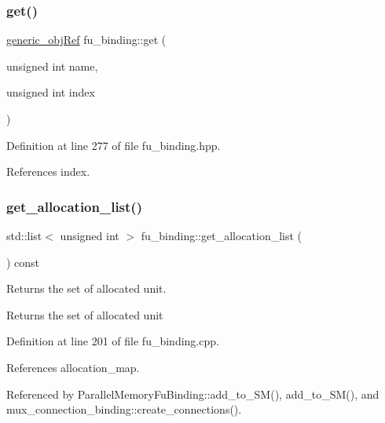 \subsubsection{\texorpdfstring{get()}{get()}\hspace{0.1cm}{\footnotesize\ttfamily [2/2]}}
{\footnotesize\ttfamily \hyperlink{generic__obj_8hpp_acb533b2ef8e0fe72e09a04d20904ca81}{generic\+\_\+obj\+Ref} fu\+\_\+binding\+::get (\begin{DoxyParamCaption}\item[{unsigned int}]{name,  }\item[{unsigned int}]{index }\end{DoxyParamCaption})\hspace{0.3cm}{\ttfamily [inline]}}



Definition at line 277 of file fu\+\_\+binding.\+hpp.



References index.

\mbox{\label{classfu__binding_a833c4b4b6c6f4d52eec19e1de37ba514}} 
\subsubsection{\texorpdfstring{get\+\_\+allocation\+\_\+list()}{get\_allocation\_list()}}
{\footnotesize\ttfamily std\+::list$<$ unsigned int $>$ fu\+\_\+binding\+::get\+\_\+allocation\+\_\+list (\begin{DoxyParamCaption}{ }\end{DoxyParamCaption}) const}



Returns the set of allocated unit. 

\begin{DoxyReturn}{Returns}
the set of allocated unit 
\end{DoxyReturn}


Definition at line 201 of file fu\+\_\+binding.\+cpp.



References allocation\+\_\+map.



Referenced by Parallel\+Memory\+Fu\+Binding\+::add\+\_\+to\+\_\+\+S\+M(), add\+\_\+to\+\_\+\+S\+M(), and mux\+\_\+connection\+\_\+binding\+::create\+\_\+connections().

